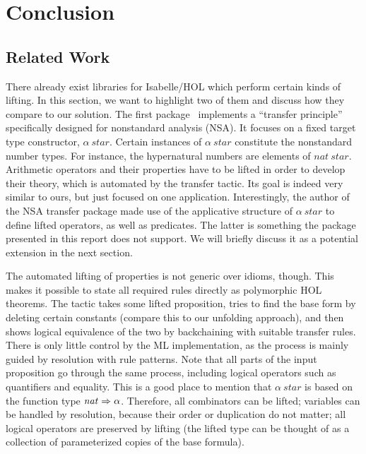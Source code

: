 \chapter{Conclusion}\label{sec:conclusion}

\section{Related Work}\label{subsec:related-work}

There already exist libraries for Isabelle/HOL which perform certain kinds of
lifting.
In this section, we want to highlight two of them and discuss how they compare
to our solution.
The first package~\cite{huffman05} implements a ``transfer principle''
specifically designed for nonstandard analysis (NSA).
It focuses on a fixed target type constructor, $\alpha\>\mathit{star}$.
Certain instances of $\alpha\>\mathit{star}$ constitute the nonstandard number
types.
For instance, the hypernatural numbers are elements of $\mathit{nat}\>\mathit{star}$.
Arithmetic operators and their properties have to be lifted in order to develop
their theory, which is automated by the transfer tactic.
Its goal is indeed very similar to ours, but just focused on one application.
Interestingly, the author of the NSA transfer package made use of the applicative
structure of $\alpha\>\mathit{star}$ to define lifted operators, as well as
predicates.
The latter is something the package presented in this report does not support.
We will briefly discuss it as a potential extension in the next section.

The automated lifting of properties is not generic over idioms, though.
This makes it possible to state all required rules directly as polymorphic
HOL theorems.
The tactic takes some lifted proposition, tries to find the base form by
deleting certain constants (compare this to our unfolding approach), and then
shows logical equivalence of the two by backchaining with suitable transfer
rules.
There is only little control by the ML implementation, as the process is mainly
guided by resolution with rule patterns.
Note that all parts of the input proposition go through the same process,
including logical operators such as quantifiers and equality.
This is a good place to mention that $\alpha\>\mathit{star}$ is based
on the function type $\mathit{nat} \Rightarrow \alpha$.
Therefore, all combinators can be lifted; variables can be handled by
resolution, because their order or duplication do not matter; all logical
operators are preserved by lifting (the lifted type can be thought of
as a collection of parameterized copies of the base formula).

